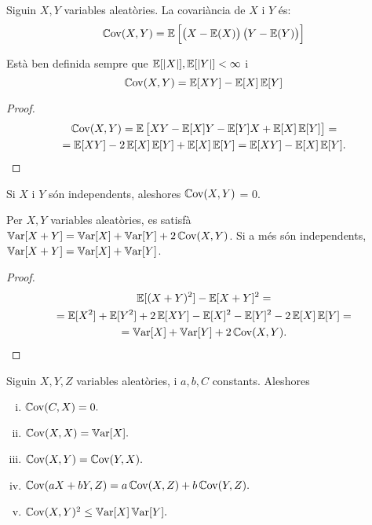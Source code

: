 \begin{defi}[covariància]
    Siguin $X, Y$ variables aleatòries. La covariància de $X$ i $Y$ \'es:
    \[
        \cov(X, Y) = \esp \left[\lp X - \esp(X) \rp \lp Y - \esp(Y) \rp \right]
    \]
\end{defi}

\begin{obs}
    Està ben definida sempre que $\esp[|X|], \esp[|Y|] < \infty$ i
    \[
        \cov(X, Y) = \esp[XY] - \esp[X]\esp[Y]
    \]
\end{obs}

\begin{proof}
    \begin{gather*} 
        \cov(X,Y) = \esp\left[XY - \esp[X]Y - \esp[Y]X + \esp[X]\esp[Y]\right] = \\
        = \esp[XY] - 2\esp[X]\esp[Y] + \esp[X]\esp[Y] 
        = \esp[XY] - \esp[X]\esp[Y].
    \end{gather*} 
\end{proof}

\begin{obs}
    Si $X$ i $Y$ són independents, aleshores $\cov(X,Y)$ = 0.
\end{obs}

\begin{obs}
    Per $X, Y$ variables aleatòries, es satisfà $\var[X + Y] = \var[X] + \var[Y] 
    + 2 \cov(X, Y)$. Si a m\'es són independents, $\var[X+Y] = \var[X] + \var[Y]$.
\end{obs}

\begin{proof}
    \begin{gather*} 
        \esp[(X+Y)^2] - \esp[X+Y]^2 =\\
        = \esp[X^2] + \esp[Y^2] + 2\esp[XY] - \esp[X]^2
        - \esp[Y]^2 - 2\esp[X]\esp[Y] =\\
        = \var[X] + \var[Y] + 2\cov(X, Y).
    \end{gather*} 
\end{proof}

\begin{prop}
    Siguin $X, Y, Z$ variables aleatòries, i $a, b, C$  constants. Aleshores
    \begin{enumerate}[i)]
    \item $\cov(C, X) = 0.$
    \item $\cov(X, X) = \var[X].$
    \item $\cov(X, Y) = \cov(Y, X).$
    \item $\cov(aX + bY, Z) = a \cov(X,Z) + b\cov(Y, Z).$
    \item $\cov(X, Y)^2 \leq \var[X]\var[Y].$
    \end{enumerate}
\end{prop}

